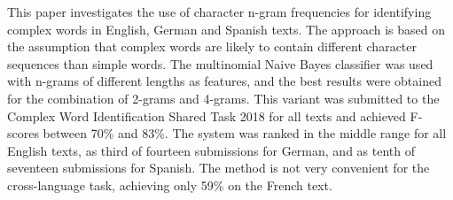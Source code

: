 This paper investigates the use of character n-gram frequencies for identifying complex words in English, German and Spanish texts. The approach is based on the assumption that complex words are likely to contain different character sequences than simple words. The multinomial Naive Bayes classifier was used with n-grams of different lengths as features, and the best results were obtained for the combination of 2-grams and 4-grams. This variant was submitted to the Complex Word Identification Shared Task 2018 for all texts and achieved F-scores between 70\% and 83\%. The system was ranked in the middle range for all English texts, as third of fourteen submissions for German, and as tenth of seventeen submissions for Spanish. The method is not very convenient for the cross-language task, achieving only 59\% on the French text.
